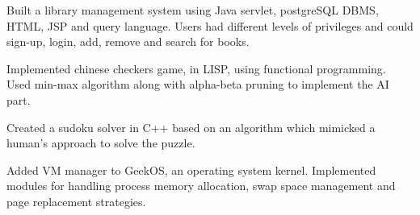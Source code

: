 



\begin{cventries}

  \cvproject
    {
      \begin{cvitems} %
         \item{ Built a library management system using Java servlet, postgreSQL DBMS, HTML, JSP and query language. Users  had different levels of privileges and could sign-up, login, add, remove and search for books.}
		\item{ Implemented chinese checkers game, in LISP, using functional programming. Used min-max algorithm along with alpha-beta pruning to implement the AI part.}
		\item{Created a sudoku solver in C++ based on an algorithm which mimicked a human’s approach to solve the puzzle.}
		\item{ Added VM manager to GeekOS, an operating system kernel. Implemented modules for handling process memory allocation, swap space management and page replacement strategies. }
      \end{cvitems}
    }

\end{cventries}